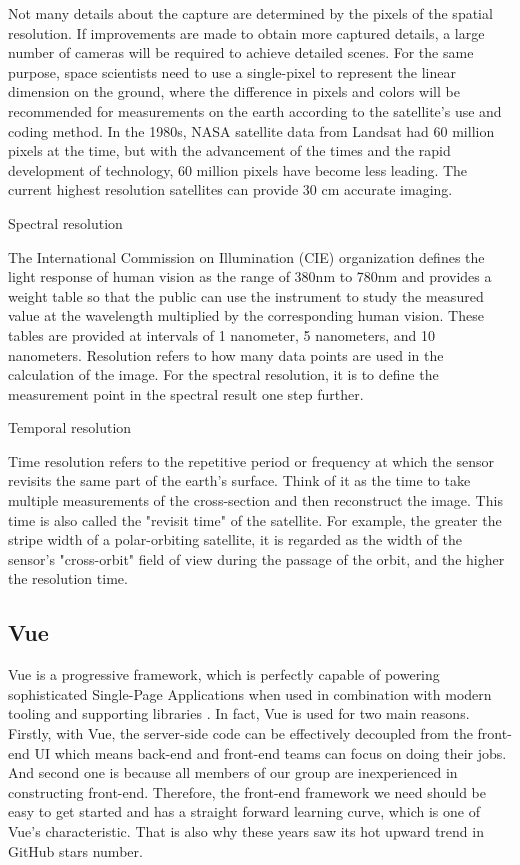 \documentclass[conference]{IEEEtran}
\newcommand{\subparagraph}{}
\begin{document}
	Not many details about the capture are determined by the pixels of the spatial resolution. If improvements are made to obtain 
	more captured details, a large number of cameras will be required to achieve detailed scenes. For the same purpose, space scientists 
	need to use a single-pixel to represent the linear dimension on the ground, where the difference in pixels and colors will be 
	recommended for measurements on the earth according to the satellite's use and coding method. In the 1980s, NASA satellite data from 
	Landsat had 60 million pixels at the time, but with the advancement of the times and the rapid development of technology, 60 million 
	pixels have become less leading. The current highest resolution satellites can provide 30 cm accurate imaging\cite{Satellit48:online}. 

	\subparagraph{Spectral resolution} 
	
	The International Commission on Illumination (CIE) organization defines the light response of human vision as the range of 380nm to 
	780nm and provides a weight table so that the public can use the instrument to study the measured value at the wavelength multiplied 
	by the corresponding human vision\cite{spectral41:online}. These tables are provided at intervals of 1 nanometer, 5 nanometers, 
	and 10 nanometers. Resolution refers to how many data points are used in the calculation of the image. For the spectral resolution, 
	it is to define the measurement point in the spectral result one step further.


	\subparagraph{Temporal resolution} 
	
	Time resolution refers to the repetitive period or frequency at which the sensor revisits the same part of the earth's 
	surface. Think of it as the time to take multiple measurements of the cross-section and then reconstruct the image. This 
	time is also called the "revisit time" of the satellite. For example, the greater the stripe width of a polar-orbiting 
	satellite, it is regarded as the width of the sensor's "cross-orbit" field of view during the passage of the orbit, and 
	the higher the resolution time\cite{Topicnot43:online}.


\subsection{Vue}

Vue is a progressive framework, which is perfectly capable of powering sophisticated Single-Page Applications when used 
in combination with modern tooling and supporting libraries \cite{Introduc89:online}. In fact, Vue is used for two main reasons. Firstly, 
with Vue, the server-side code can be effectively decoupled from the front-end UI which means back-end and front-end 
teams can focus on doing their jobs. And second one is because all members of our group are inexperienced in constructing 
front-end. Therefore, the front-end framework we need should be easy to get started and has a straight forward learning 
curve, which is one of Vue’s characteristic. That is also why these years saw its hot upward trend in GitHub stars number.
\end{document}

